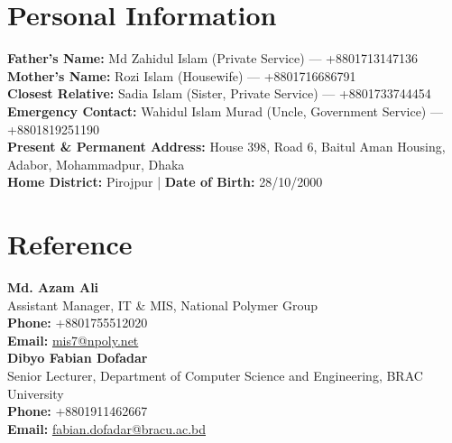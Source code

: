 \documentclass[a4paper]{article}
\begin{document}
\section{Personal Information}
 \begin{itemize}[leftmargin=0.15in, label={}]
    \small{\item{
    \textbf{Father's Name:} Md Zahidul Islam (Private Service) --- +8801713147136 \\
    \textbf{Mother's Name:} Rozi Islam (Housewife) --- +8801716686791 \\
    \textbf{Closest Relative:} Sadia Islam (Sister, Private Service) --- +8801733744454 \\
    \textbf{Emergency Contact:} Wahidul Islam Murad (Uncle, Government Service) --- +8801819251190 \\
    \textbf{Present \& Permanent Address:} House 398, Road 6, Baitul Aman Housing, Adabor, Mohammadpur, Dhaka \\
    \textbf{Home District:} Pirojpur \;|\; \textbf{Date of Birth:} 28/10/2000
    }}
 \end{itemize}


\section{Reference}
 \begin{itemize}[leftmargin=0.15in, label={}]
    \small{\item{
    {\large\textbf{Md. Azam Ali}} \\
    Assistant Manager, IT \& MIS, National Polymer Group \\
    \textbf{Phone:} +8801755512020 \\
    \textbf{Email:} \href{mailto:mis7@npoly.net}{mis7@npoly.net} \\[12pt]
    {\large\textbf{Dibyo Fabian Dofadar}} \\
    Senior Lecturer, Department of Computer Science and Engineering, BRAC University \\
    \textbf{Phone:} +8801911462667 \\
    \textbf{Email:} \href{mailto:fabian.dofadar@bracu.ac.bd}{fabian.dofadar@bracu.ac.bd}
    }}
 \end{itemize}


\end{document}
